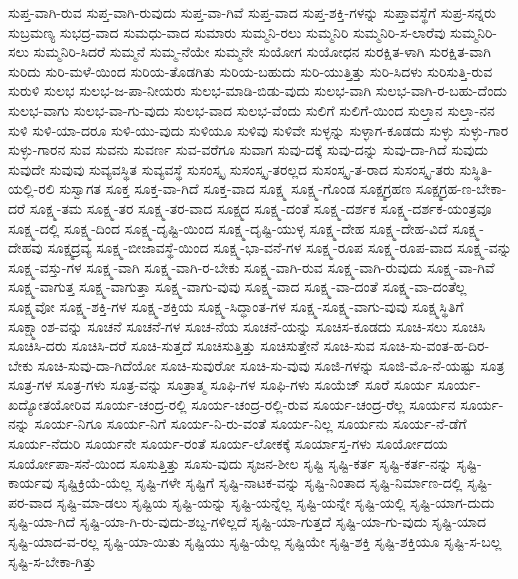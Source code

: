 {ಸುಪ್ತ-ವಾಗಿ-ರುವ
ಸುಪ್ತ-ವಾಗಿ-ರುವುದು
ಸುಪ್ತ-ವಾ-ಗಿವೆ
ಸುಪ್ತ-ವಾದ
ಸುಪ್ತ-ಶಕ್ತಿ-ಗಳನ್ನು
ಸುಪ್ತಾವಸ್ಥೆಗೆ
ಸುಪ್ರ-ಸನ್ನರು
ಸುಬ್ರಮಣ್ಯ
ಸುಭದ್ರ-ವಾದ
ಸುಮಧು-ವಾದ
ಸುಮಾರು
ಸುಮ್ಮನಿ-ರಲು
ಸುಮ್ಮನಿರಿ
ಸುಮ್ಮನಿರಿ-ಸ-ಲಾರೆವು
ಸುಮ್ಮನಿರಿ-ಸಲು
ಸುಮ್ಮನಿರಿ-ಸಿದರೆ
ಸುಮ್ಮನೆ
ಸುಮ್ಮ-ನೆಯೇ
ಸುಮ್ಮನೇ
ಸುಯೋಗ
ಸುಯೋಧನ
ಸುರಕ್ಷಿತ-ಳಾಗಿ
ಸುರಕ್ಷಿತ-ವಾಗಿ
ಸುರಿದು
ಸುರಿ-ಮಳೆ-ಯಿಂದ
ಸುರಿಯ-ತೊಡಗಿತು
ಸುರಿಯ-ಬಹುದು
ಸುರಿ-ಯುತ್ತಿತ್ತು
ಸುರಿ-ಸಿದಳು
ಸುರಿಸುತ್ತಿ-ರುವ
ಸುರುಳಿ
ಸುಲಭ
ಸುಲಭ-ಜ-ಪಾ-ನೀಯರು
ಸುಲಭ-ಮಾಡಿ-ಬಿಡು-ವುದು
ಸುಲಭ-ವಾಗಿ
ಸುಲಭ-ವಾಗಿ-ರ-ಬಹು-ದೆಂದು
ಸುಲಭ-ವಾಗು
ಸುಲಭ-ವಾ-ಗು-ವುದು
ಸುಲಭ-ವಾದ
ಸುಲಭ-ವೆಂದು
ಸುಲಿಗೆ
ಸುಲಿಗೆ-ಯಿಂದ
ಸುಲ್ತಾನ
ಸುಲ್ತಾ-ನನ
ಸುಳಿ
ಸುಳಿ-ಯಾ-ದರೂ
ಸುಳಿ-ಯು-ವುದು
ಸುಳಿಯೂ
ಸುಳಿವು
ಸುಳಿವೇ
ಸುಳ್ಳನ್ನು
ಸುಳ್ಳಾಗ-ಕೂಡದು
ಸುಳ್ಳು
ಸುಳ್ಳು-ಗಾರ
ಸುಳ್ಳು-ಗಾರನ
ಸುವ
ಸುವನು
ಸುವರ್ಣ
ಸುವ-ವರೆಗೂ
ಸುವಾಗ
ಸುವು-ದಕ್ಕೆ
ಸುವು-ದನ್ನು
ಸುವು-ದಾ-ಗಿದೆ
ಸುವುದು
ಸುವುದೇ
ಸುವುವು
ಸುವ್ಯವಸ್ಥಿತ
ಸುವ್ಯವಸ್ಥೆ
ಸುಸಂಸ್ಕೃ
ಸುಸಂಸ್ಕೃ-ತರಲ್ಲದ
ಸುಸಂಸ್ಕೃ-ತ-ರಾದ
ಸುಸಂಸ್ಕೃ-ತರು
ಸುಸ್ಥಿತಿ-ಯಲ್ಲಿ-ರಲಿ
ಸುಸ್ವಾಗತ
ಸೂಕ್ತ
ಸೂಕ್ತ-ವಾ-ಗಿದೆ
ಸೂಕ್ತ-ವಾದ
ಸೂಕ್ಷ್ಮ
ಸೂಕ್ಷ್ಮ-ಗೊಂಡ
ಸೂಕ್ಷ್ಮಗ್ರಹಣ
ಸೂಕ್ಷ್ಮಗ್ರಹ-ಣ-ಬೇಕಾ-ದರೆ
ಸೂಕ್ಷ್ಮ-ತಮ
ಸೂಕ್ಷ್ಮ-ತರ
ಸೂಕ್ಷ್ಮ-ತರ-ವಾದ
ಸೂಕ್ಷ್ಮದ
ಸೂಕ್ಷ್ಮ-ದಂತೆ
ಸೂಕ್ಷ್ಮ-ದರ್ಶಕ
ಸೂಕ್ಷ್ಮ-ದರ್ಶಕ-ಯಂತ್ರವೂ
ಸೂಕ್ಷ್ಮ-ದಲ್ಲಿ
ಸೂಕ್ಷ್ಮ-ದಿಂದ
ಸೂಕ್ಷ್ಮ-ದೃಷ್ಟಿ-ಯಿಂದ
ಸೂಕ್ಷ್ಮ-ದೃಷ್ಟಿ-ಯುಳ್ಳ
ಸೂಕ್ಷ್ಮ-ದೇಹ
ಸೂಕ್ಷ್ಮ-ದೇಹ-ವಿದೆ
ಸೂಕ್ಷ್ಮ-ದೇಹವು
ಸೂಕ್ಷ್ಮದ್ರವ್ಯ
ಸೂಕ್ಷ್ಮ-ಬೀಜಾವಸ್ಥೆ-ಯಿಂದ
ಸೂಕ್ಷ್ಮ-ಭಾ-ವನೆ-ಗಳ
ಸೂಕ್ಷ್ಮ-ರೂಪ
ಸೂಕ್ಷ್ಮ-ರೂಪ-ವಾದ
ಸೂಕ್ಷ್ಮ-ವನ್ನು
ಸೂಕ್ಷ್ಮ-ವಸ್ತು-ಗಳ
ಸೂಕ್ಷ್ಮ-ವಾಗಿ
ಸೂಕ್ಷ್ಮ-ವಾಗಿ-ರ-ಬೇಕು
ಸೂಕ್ಷ್ಮ-ವಾಗಿ-ರುವ
ಸೂಕ್ಷ್ಮ-ವಾಗಿ-ರುವುದು
ಸೂಕ್ಷ್ಮ-ವಾ-ಗಿವೆ
ಸೂಕ್ಷ್ಮ-ವಾಗುತ್ತ
ಸೂಕ್ಷ್ಮ-ವಾಗುತ್ತಾ
ಸೂಕ್ಷ್ಮ-ವಾಗು-ವುವು
ಸೂಕ್ಷ್ಮ-ವಾದ
ಸೂಕ್ಷ್ಮ-ವಾ-ದಂತೆ
ಸೂಕ್ಷ್ಮ-ವಾ-ದಂತೆಲ್ಲ
ಸೂಕ್ಷ್ಮವೋ
ಸೂಕ್ಷ್ಮ-ಶಕ್ತಿ-ಗಳ
ಸೂಕ್ಷ್ಮ-ಶಕ್ತಿಯ
ಸೂಕ್ಷ್ಮ-ಸಿದ್ಧಾಂತ-ಗಳ
ಸೂಕ್ಷ್ಮ-ಸೂಕ್ಷ್ಮ-ವಾಗು-ವುವು
ಸೂಕ್ಷ್ಮಸ್ಥಿತಿಗೆ
ಸೂಕ್ಷ್ಮಾಂಶ-ವನ್ನು
ಸೂಚನೆ
ಸೂಚನೆ-ಗಳ
ಸೂಚ-ನೆಯ
ಸೂಚನೆ-ಯನ್ನು
ಸೂಚಿಸ-ಕೂಡದು
ಸೂಚಿ-ಸಲು
ಸೂಚಿಸಿ
ಸೂಚಿಸಿ-ದರು
ಸೂಚಿಸಿ-ದರೆ
ಸೂಚಿ-ಸುತ್ತದೆ
ಸೂಚಿಸುತ್ತಿತ್ತು
ಸೂಚಿಸುತ್ತೇನೆ
ಸೂಚಿ-ಸುವ
ಸೂಚಿ-ಸು-ವಂತ-ಹ-ದಿರ-ಬೇಕು
ಸೂಚಿ-ಸುವು-ದಾ-ಗಿದೆಯೋ
ಸೂಚಿ-ಸುವುರೋ
ಸೂಚಿ-ಸು-ವುವು
ಸೂಜಿ-ಗಳನ್ನು
ಸೂಜಿ-ಮೊ-ನೆ-ಯಷ್ಟು
ಸೂತ್ರ
ಸೂತ್ರ-ಗಳ
ಸೂತ್ರ-ಗಳು
ಸೂತ್ರ-ವನ್ನು
ಸೂತ್ರಾತ್ಮ
ಸೂಫಿ-ಗಳ
ಸೂಫಿ-ಗಳು
ಸೂಯೆಜ್
ಸೂರೆ
ಸೂರ್ಯ
ಸೂರ್ಯ-ಖದ್ಯೋತಯೋರಿವ
ಸೂರ್ಯ-ಚಂದ್ರ-ರಲ್ಲಿ
ಸೂರ್ಯ-ಚಂದ್ರ-ರಲ್ಲಿ-ರುವ
ಸೂರ್ಯ-ಚಂದ್ರ-ರೆಲ್ಲ
ಸೂರ್ಯನ
ಸೂರ್ಯ-ನನ್ನು
ಸೂರ್ಯ-ನಿಗೂ
ಸೂರ್ಯ-ನಿಗೆ
ಸೂರ್ಯ-ನಿ-ರು-ವಂತೆ
ಸೂರ್ಯ-ನಿಲ್ಲ
ಸೂರ್ಯನು
ಸೂರ್ಯ-ನೆ-ಡೆಗೆ
ಸೂರ್ಯ-ನೆದುರಿ
ಸೂರ್ಯನೇ
ಸೂರ್ಯ-ರಂತೆ
ಸೂರ್ಯ-ಲೋಕಕ್ಕೆ
ಸೂರ್ಯಾಸ್ತ-ಗಳು
ಸೂರ್ಯೋದಯ
ಸೂರ್ಯೋಪಾ-ಸನೆ-ಯಿಂದ
ಸೂಸುತ್ತಿತ್ತು
ಸೂಸು-ವುದು
ಸೃಜನ-ಶೀಲ
ಸೃಷ್ಟಿ
ಸೃಷ್ಟಿ-ಕರ್ತ
ಸೃಷ್ಟಿ-ಕರ್ತ-ನನ್ನು
ಸೃಷ್ಟಿ-ಕಾರ್ಯವು
ಸೃಷ್ಟಿಕ್ರಿಯೆ-ಯೆಲ್ಲ
ಸೃಷ್ಟಿ-ಗಳೇ
ಸೃಷ್ಟಿಗೆ
ಸೃಷ್ಟಿ-ನಾಟಕ-ವನ್ನು
ಸೃಷ್ಟಿ-ನಿಂತಾದ
ಸೃಷ್ಟಿ-ನಿರ್ಮಾಣ-ದಲ್ಲಿ
ಸೃಷ್ಟಿ-ಪರ-ವಾದ
ಸೃಷ್ಟಿ-ಮಾ-ಡಲು
ಸೃಷ್ಟಿಯ
ಸೃಷ್ಟಿ-ಯನ್ನು
ಸೃಷ್ಟಿ-ಯನ್ನೆಲ್ಲ
ಸೃಷ್ಟಿ-ಯನ್ನೇ
ಸೃಷ್ಟಿ-ಯಲ್ಲಿ
ಸೃಷ್ಟಿ-ಯಾಗ-ದುದು
ಸೃಷ್ಟಿ-ಯಾ-ಗಿದೆ
ಸೃಷ್ಟಿ-ಯಾ-ಗಿ-ರು-ವುದು-ಶಬ್ದ-ಗಳಿಲ್ಲದೆ
ಸೃಷ್ಟಿ-ಯಾ-ಗುತ್ತದೆ
ಸೃಷ್ಟಿ-ಯಾ-ಗು-ವುದು
ಸೃಷ್ಟಿ-ಯಾದ
ಸೃಷ್ಟಿ-ಯಾದ-ವ-ರಲ್ಲ
ಸೃಷ್ಟಿ-ಯಾ-ಯಿತು
ಸೃಷ್ಟಿಯು
ಸೃಷ್ಟಿ-ಯೆಲ್ಲ
ಸೃಷ್ಟಿಯೇ
ಸೃಷ್ಟಿ-ಶಕ್ತಿ
ಸೃಷ್ಟಿ-ಶಕ್ತಿಯೂ
ಸೃಷ್ಟಿ-ಸ-ಬಲ್ಲ
ಸೃಷ್ಟಿ-ಸ-ಬೇಕಾ-ಗಿತ್ತು
}
